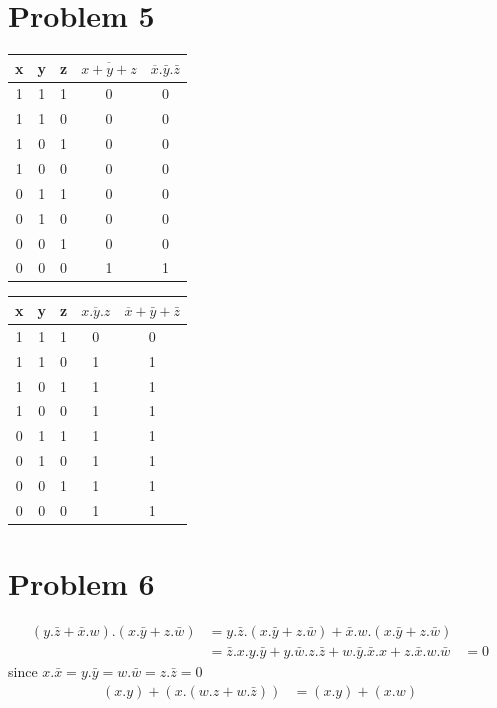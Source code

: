 \documentclass[12pt]{article}
\begin{document}
\section*{Problem 5}
\begin{center}
    \begin{tabular}{ |c|c|c||c|c| }
        x & y & z & $\overline{x+y+z}$ & $\overline{x}.\bar{y}.\bar{z}$\\
        \hline
        1 & 1 & 1 & 0 & 0\\
        \hline
        1 & 1 & 0 & 0 & 0\\
        \hline
        1 & 0 & 1 & 0 & 0\\
        \hline
        1 & 0 & 0 & 0 & 0\\
        \hline
        0 & 1 & 1 & 0 & 0\\
        \hline
        0 & 1 & 0 & 0 & 0\\
        \hline
        0 & 0 & 1 & 0 & 0\\
        \hline
        0 & 0 & 0 & 1 & 1\\
        \hline
    \end{tabular}
\end{center}

\begin{center}
    \begin{tabular}{ |c|c|c||c|c| }
        x & y & z & $\overline{x.y.z}$ & $\overline{x}+\bar{y}+\bar{z}$\\
        \hline
        1 & 1 & 1 & 0 & 0\\
        \hline
        1 & 1 & 0 & 1 & 1\\
        \hline
        1 & 0 & 1 & 1 & 1\\
        \hline
        1 & 0 & 0 & 1 & 1\\
        \hline
        0 & 1 & 1 & 1 & 1\\
        \hline
        0 & 1 & 0 & 1 & 1\\
        \hline
        0 & 0 & 1 & 1 & 1\\
        \hline
        0 & 0 & 0 & 1 & 1\\
        \hline
    \end{tabular}
\end{center}
\section*{Problem 6}
\begin{align*}
    (y.\bar{z}+\bar{x}.w).(x.\bar{y}+z.\bar{w})&=y.\bar{z}.(x.\bar{y}+z.\bar{w})+\bar{x}.w.(x.\bar{y}+z.\bar{w})\\
    &=\bar{z}.x.y.\bar{y}+y.\bar{w}.z.\bar{z}+w.\bar{y}.\bar{x}.x+z.\bar{x}.w.\bar{w}
    &=\boxed{0}
\end{align*}
since $x.\bar{x}=y.\bar{y}=w.\bar{w}=z.\bar{z}=0$
\begin{align*}
    (x.y)+(x.(w.z+w.\bar{z}))&=\boxed{(x.y)+(x.w)}
\end{align*}
\end{document}
